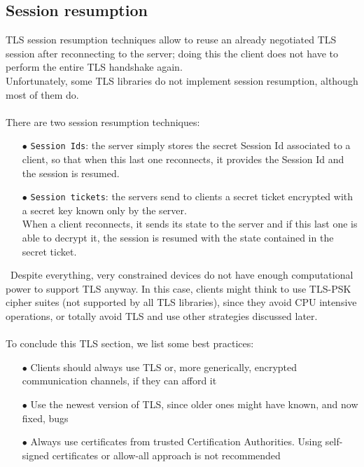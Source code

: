 \documentclass[12pt]{report}
\begin{document}
{\subsection{Session resumption}
\bigskip
TLS session resumption techniques allow to reuse an already negotiated TLS session after reconnecting to the server; doing this the client does not have to perform the entire TLS handshake again.\\
Unfortunately, some TLS libraries do not implement session resumption, although most of them do.\\\\
There are two session resumption techniques:
\begin{itemize}
\setlength{\itemindent}{+4mm}
  \item[$\bullet$] \texttt{Session Ids}: the server simply stores the secret Session Id associated to a client, so that when this last one reconnects, it provides the Session Id and the session is resumed.
  \item[$\bullet$] \texttt{Session tickets}: the servers send to clients a secret ticket encrypted with a secret key known only by the server.\\
When a client reconnects, it sends its state to the server and if this last one is able to decrypt it, the session is resumed with the state contained in the secret ticket.
\end{itemize}\
Despite everything, very constrained devices do not have enough computational power to support TLS anyway. 
In this case, clients might think to use TLS-PSK cipher suites (not supported by all TLS libraries), since they avoid CPU intensive operations, or totally avoid TLS and use other strategies discussed later.\\\\

To conclude this TLS section, we list some best practices:

\begin{itemize}
\setlength{\itemindent}{+4mm}
  \item[$\bullet$] Clients should always use TLS or, more generically, encrypted communication channels, if they can afford it
  \item[$\bullet$] Use the newest version of TLS, since older ones might have known, and now fixed, bugs~\cite{sslvulns}
  \item[$\bullet$] Always use certificates from trusted Certification Authorities. Using self-signed certificates or allow-all approach is not recommended


\end{itemize}}
\end{document}

